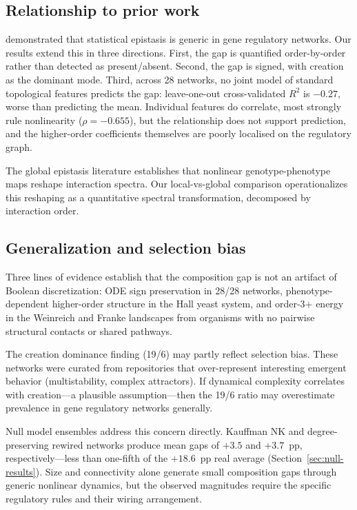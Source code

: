 \documentclass[10pt]{article}
\begin{document}
\subsection{Relationship to prior work}

\citet{gjuvsland2007statistical} demonstrated that
statistical epistasis is generic in gene regulatory networks. Our
results extend this in three directions. First, the gap is quantified
order-by-order rather than detected as present/absent. Second, the
gap is signed, with creation as the dominant mode. Third, across 28
networks, no joint model of standard topological features predicts the
gap: leave-one-out cross-validated $R^2$ is $-0.27$, worse than
predicting the mean. Individual features do correlate, most strongly
rule nonlinearity ($\rho = -0.655$), but the relationship does not
support prediction, and the higher-order coefficients themselves are
poorly localised on the regulatory graph.

The global epistasis literature \citep{otwinowski2018inferring, reddy2021global} establishes that nonlinear genotype-phenotype maps
reshape interaction spectra. Our local-vs-global comparison
operationalizes this reshaping as a quantitative spectral
transformation, decomposed by interaction order.


\subsection{Generalization and selection bias}

Three lines of evidence establish that the composition gap is not an
artifact of Boolean discretization: ODE sign preservation in 28/28
networks, phenotype-dependent higher-order structure in the Hall
yeast system, and order-3+ energy in the Weinreich and Franke
landscapes from organisms with no pairwise structural contacts or
shared pathways.

The creation dominance finding (19/6) may partly reflect selection
bias. These networks were curated from repositories that
over-represent interesting emergent behavior (multistability, complex
attractors). If dynamical complexity correlates with creation---a
plausible assumption---then the 19/6 ratio may overestimate
prevalence in gene regulatory networks generally.

Null model ensembles address this concern directly. Kauffman NK and
degree-preserving rewired networks produce mean gaps of $+3.5$ and
$+3.7$~pp, respectively---less than one-fifth of the $+18.6$~pp
real average (Section~\ref{sec:null-results}). Size and connectivity
alone generate small composition gaps through generic nonlinear
dynamics, but the observed magnitudes require the specific regulatory
rules and their wiring arrangement.
\end{document}
